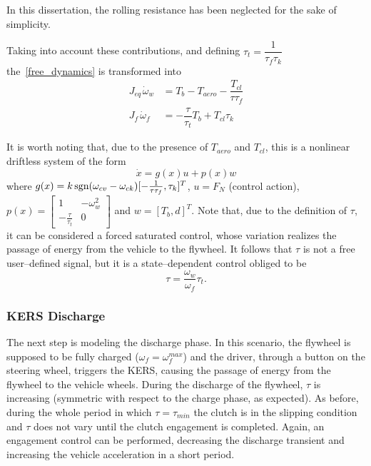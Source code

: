 \documentclass[11pt]{article}
\begin{document}
In this dissertation, the rolling resistance has been neglected for the sake of simplicity.

Taking into account these contributions, and defining $\tau_{t} = \dfrac{1}{\tau_f \tau_k}$ the~\eqref{free_dynamics} is transformed into 
\begin{equation}
\begin{split}
J_{eq\,} \dot{\omega}_w & = T_b - T_{aero} - \dfrac{T_{cl}}{\tau \tau_f} \\
J_f\, \dot{\omega}_f & = -\dfrac{\tau}{\tau_{t}} T_b + T_{cl} \tau_k
\end{split}
\label{kers_full_dynamics_charge}
\end{equation}

It is worth noting that, due to the presence of $T_{aero}$ and $T_{cl}$, this is a nonlinear driftless system of the form
\[
\dot{x} = g(x)u + p(x)w 
\]
where $g(x) = k \, \textup{sgn} (\omega_{cv} - \omega_{ck}) [-\frac{1}{\tau \tau_f} , \tau_k]^T$, $u = F_N$ (control action), $p(x) =\left[  \begin{smallmatrix}
1 & -\omega_w^2 \\
-\frac{\tau}{\tau_t} & 0
\end{smallmatrix}\right] $
and $w = [T_b, d]^T$. Note that, due to the definition of $\tau$, it can be considered a forced saturated control, whose variation realizes the passage of energy from the vehicle to the flywheel. It follows that $\tau$ is not a free user--defined signal, but it is a state--dependent control obliged to be
\[
\tau = \dfrac{\omega_w}{\omega_f} \tau_t.
\]

\subsubsection{KERS Discharge}

The next step is modeling the discharge phase. In this scenario, the flywheel is supposed to be fully charged ($\omega_f = \omega_f^{max}$) and the driver, through a button on the steering wheel, triggers the KERS, causing the passage of energy from the flywheel to the vehicle wheels. During the discharge of the flywheel, $\tau$ is increasing (symmetric with respect to the charge phase, as expected). As before, during the whole period in which $\tau = \tau_{min}$ the clutch is in the slipping condition and $\tau$ does not vary until the clutch engagement is completed. Again, an engagement control can be performed, decreasing the discharge transient and increasing the vehicle acceleration in a short period.
\end{document}
